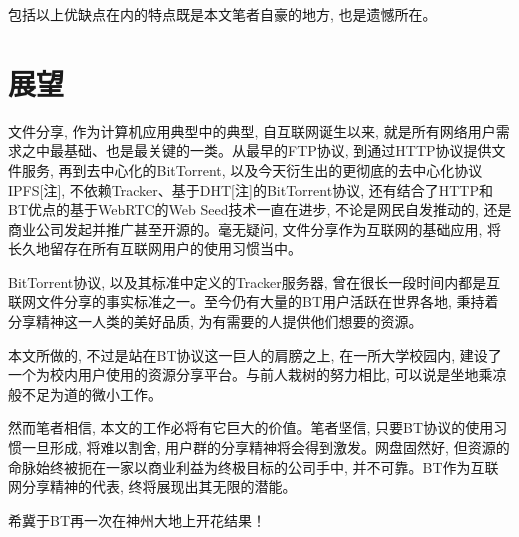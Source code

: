 包括以上优缺点在内的特点既是本文笔者自豪的地方, 也是遗憾所在。

\section{展望}

文件分享, 作为计算机应用典型中的典型, 自互联网诞生以来, 就是所有网络用户需求之中最基础、也是最关键的一类。从最早的FTP协议, 到通过HTTP协议提供文件服务, 再到去中心化的BitTorrent, 以及今天衍生出的更彻底的去中心化协议IPFS[注], 不依赖Tracker、基于DHT[注]的BitTorrent协议, 还有结合了HTTP和BT优点的基于WebRTC的Web Seed技术一直在进步, 不论是网民自发推动的, 还是商业公司发起并推广甚至开源的。毫无疑问, 文件分享作为互联网的基础应用, 将长久地留存在所有互联网用户的使用习惯当中。

BitTorrent协议, 以及其标准中定义的Tracker服务器, 曾在很长一段时间内都是互联网文件分享的事实标准之一。至今仍有大量的BT用户活跃在世界各地, 秉持着分享精神这一人类的美好品质, 为有需要的人提供他们想要的资源。

本文所做的, 不过是站在BT协议这一巨人的肩膀之上, 在一所大学校园内, 建设了一个为校内用户使用的资源分享平台。与前人栽树的努力相比, 可以说是坐地乘凉般不足为道的微小工作。

然而笔者相信, 本文的工作必将有它巨大的价值。笔者坚信, 只要BT协议的使用习惯一旦形成, 将难以割舍, 用户群的分享精神将会得到激发。网盘固然好, 但资源的命脉始终被扼在一家以商业利益为终极目标的公司手中, 并不可靠。BT作为互联网分享精神的代表, 终将展现出其无限的潜能。

希冀于BT再一次在神州大地上开花结果！






